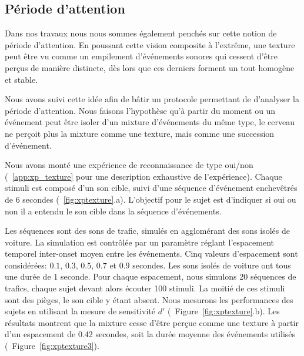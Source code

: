 \subsection{Période d'attention}

Dans nos travaux nous nous sommes également penchés sur cette notion de période d'attention. En poussant cette vision composite à l’extrême, une texture peut être vu comme un empilement d’événements sonores qui cessent d'être perçus de manière distincte, dès lors que ces derniers forment un tout homogène et stable. 

Nous avons suivi cette idée afin de bâtir un protocole permettant de d'analyser la période d'attention. Nous faisons l'hypothèse qu'à partir du moment ou un événement peut être isoler d'un mixture d'événements du même type, le cerveau ne perçoit plus la mixture comme une texture, mais comme une succession d'événement.

Nous avons monté une expérience de reconnaissance de type oui/non (\Cf~\ref{app:xp_texture} pour une description exhaustive de l'expérience). Chaque stimuli est composé d'un son cible, suivi d'une séquence d'événement enchevêtrés de 6 secondes (\Cf~\ref{fig:xptexture}.a). L'objectif pour le sujet est d'indiquer si oui ou non il a entendu le son cible dans la séquence d’événements.

Les séquences sont des sons de trafic, simulés en agglomérant des sons isolés de voiture. La simulation est contrôlée par un paramètre réglant l'espacement temporel inter-onset moyen entre les événements. Cinq valeurs d'espacement sont considérées: $0.1$, $0.3$, $0.5$, $0.7$ et $0.9$ secondes. Les sons isolés de voiture ont tous une durée de $1$ seconde. Pour chaque espacement, nous simulons 20 séquences de trafics, chaque sujet devant alors écouter 100 stimuli. La moitié de ces stimuli sont des pièges, le son cible y étant absent. Nous mesurons les performances des sujets en utilisant la mesure de sensitivité $d'$ (\Cf~Figure~\ref{fig:xptexture}.b). Les résultats montrent que la mixture cesse d'être perçue comme une texture à partir d'un espacement de 0.42 secondes, soit la durée moyenne des événements utilisés (\Cf~Figure~\ref{fig:xptexture3}).

